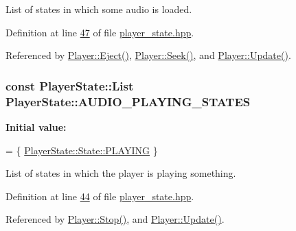 List of states in which some audio is loaded. 



Definition at line \hyperlink{player__state_8hpp_source_l00047}{47} of file \hyperlink{player__state_8hpp_source}{player\+\_\+state.\+hpp}.



Referenced by \hyperlink{player_8cpp_source_l00079}{Player\+::\+Eject()}, \hyperlink{player_8cpp_source_l00134}{Player\+::\+Seek()}, and \hyperlink{player_8cpp_source_l00034}{Player\+::\+Update()}.

\hypertarget{classPlayerState_aa5e7203a1fa44e8bceffe65b6ad2c554}{
\subsubsection[{A\+U\+D\+I\+O\+\_\+\+P\+L\+A\+Y\+I\+N\+G\+\_\+\+S\+T\+A\+T\+E\+S}]{\setlength{\rightskip}{0pt plus 5cm}const {\bf Player\+State\+::\+List} Player\+State\+::\+A\+U\+D\+I\+O\+\_\+\+P\+L\+A\+Y\+I\+N\+G\+\_\+\+S\+T\+A\+T\+E\+S\hspace{0.3cm}{\ttfamily [static]}}}\label{classPlayerState_aa5e7203a1fa44e8bceffe65b6ad2c554}
{\bfseries Initial value\+:}
\begin{DoxyCode}
= \{
    \hyperlink{classPlayerState_ab013f68ff23d69d677faae624b5dff07a50366a49630a416ab3ccaa004196027e}{PlayerState::State::PLAYING}
\}
\end{DoxyCode}


List of states in which the player is playing something. 



Definition at line \hyperlink{player__state_8hpp_source_l00044}{44} of file \hyperlink{player__state_8hpp_source}{player\+\_\+state.\+hpp}.



Referenced by \hyperlink{player_8cpp_source_l00159}{Player\+::\+Stop()}, and \hyperlink{player_8cpp_source_l00034}{Player\+::\+Update()}.

